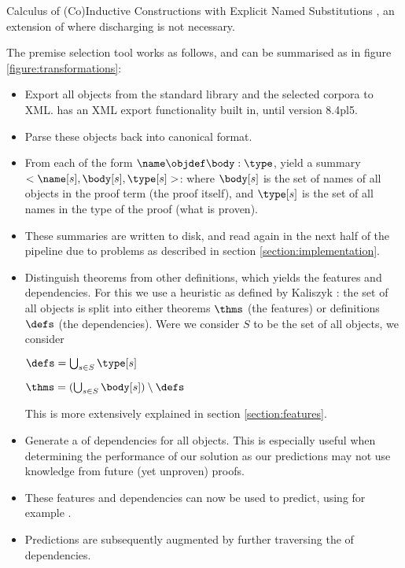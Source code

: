 \begin{definition}[\acic]
	Calculus of (Co)Inductive Constructions with Explicit Named Substitutions \cite{coen2000progettazione},
	an extension of \cic where discharging is not necessary.
\end{definition}

The premise selection tool works as follows, and can be summarised as in figure \ref{figure:transformations}:
\begin{itemize}
    \item Export all \coq objects from the standard library and the selected corpora to XML.
		\coq has an XML export functionality built in, until version 8.4pl5.
	\item Parse these objects back into canonical \acic{} format.
	\item From each \coqobj[s] of the form $\name \objdef \body : \type$, yield a summary $<\name[s], \body[s], \type[s]>$:
		where $\body[s]$  is the set of names of all objects in the proof term (the proof itself),
		and $\type[s]$  is the set of all names in the type of the proof (what is proven).
	\item These summaries are written to disk, and read again in the next half of the pipeline due to problems as described in section \ref{section:implementation}.
	\item Distinguish theorems from other definitions, which yields the features and dependencies.
		For this we use a heuristic as defined by Kaliszyk \cite{kaliszyk2014machine}:
		the set of all objects is split into either theorems $\thms$ (the features) or definitions $\defs$ (the dependencies).
		Were we consider $S$ to be the set of all \coq objects, we consider
		\begin{definition}
			$\defs = \bigcup_{s \in S} \type[s]$
		\end{definition}
		\begin{definition}
			$\thms = (\bigcup_{s \in S} \body[s]) \setminus \defs$
		\end{definition}
		This is more extensively explained in section \ref{section:features}.
    \item Generate a \dagraph of dependencies for all \coq objects.
		This is especially useful when determining the performance of our solution as our predictions may not use
		knowledge from future (yet unproven) proofs.
	\item These features and dependencies can now be used to predict, using for example \knn.
	\item Predictions are subsequently augmented by further traversing the \dagraph of dependencies.
\end{itemize}

